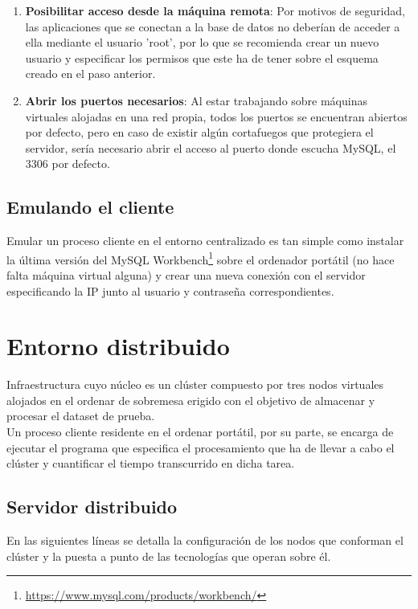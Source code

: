 \begin{enumerate}
\item \textbf{Posibilitar acceso desde la máquina remota}:  Por motivos de seguridad, las aplicaciones que se conectan a la base de datos no deberían de acceder a ella mediante el usuario 'root', por lo que se recomienda crear un nuevo usuario y especificar los permisos que este ha de tener sobre el esquema creado en el paso anterior.

\item \textbf{Abrir los puertos necesarios}: Al estar trabajando sobre máquinas virtuales alojadas en una red propia, todos los puertos se encuentran abiertos por defecto, pero en caso de existir algún cortafuegos que protegiera el servidor, sería necesario abrir el acceso al puerto donde escucha MySQL, el 3306 por defecto.

\end{enumerate}

\subsection{Emulando el cliente}

Emular un proceso cliente en el entorno centralizado es tan simple como instalar la última versión del MySQL Workbench\footnote{\url{https://www.mysql.com/products/workbench/}} sobre el ordenador portátil (no hace falta máquina virtual alguna) y crear una nueva conexión con el servidor especificando la IP junto al usuario y contraseña correspondientes.

\section{Entorno distribuido}

Infraestructura cuyo núcleo es un clúster compuesto por tres nodos virtuales alojados en el ordenar de sobremesa erigido con el objetivo de almacenar y procesar el dataset de prueba.\\ 

Un proceso cliente residente en el ordenar portátil, por su parte, se encarga de ejecutar el programa que especifica el procesamiento que ha de llevar a cabo el clúster y cuantificar el tiempo transcurrido en dicha tarea.

\subsection{Servidor distribuido}

En las siguientes líneas se detalla la configuración de los nodos que conforman el clúster y la puesta a punto de las tecnologías que operan sobre él.

